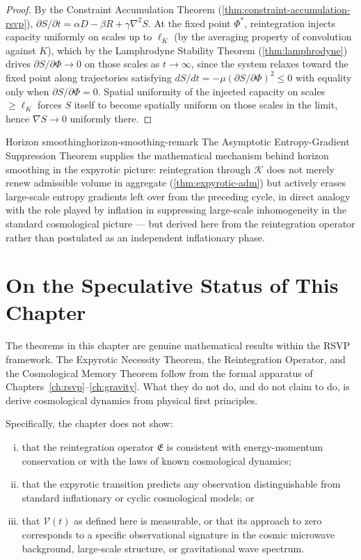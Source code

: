 \documentclass[12pt,twoside,openright]{book}
\begin{document}
\begin{proof}
  By the Constraint Accumulation Theorem
  (\cref{thm:constraint-accumulation-rsvp}),
  $\partial S/\partial t = \alpha D - \beta R + \gamma\nabla^2 S$.
  At the fixed point $\Phi^*$, reintegration injects capacity
  uniformly on scales up to $\ell_K$ (by the averaging
  property of convolution against $K$), which by the
  Lamphrodyne Stability Theorem (\cref{thm:lamphrodyne})
  drives $\partial S/\partial\Phi \to 0$ on those scales as
  $t\to\infty$, since the system relaxes toward the fixed
  point along trajectories satisfying
  $dS/dt = -\mu(\partial S/\partial\Phi)^2 \le 0$ with
  equality only when $\partial S/\partial\Phi = 0$. Spatial
  uniformity of the injected capacity on scales $\ge\ell_K$
  forces $S$ itself to become spatially uniform on those
  scales in the limit, hence $\nabla S \to 0$ uniformly
  there.
\end{proof}

\begin{remark}{Horizon smoothing}{horizon-smoothing-remark}
  The Asymptotic Entropy-Gradient Suppression Theorem
  supplies the mathematical mechanism behind horizon
  smoothing in the expyrotic picture: reintegration through
  $\mathcal{K}$ does not merely renew admissible volume in
  aggregate (\cref{thm:expyrotic-adm}) but actively erases
  large-scale entropy gradients left over from the
  preceding cycle, in direct analogy with the role played by
  inflation in suppressing large-scale inhomogeneity in the
  standard cosmological picture --- but derived here from
  the reintegration operator rather than postulated as an
  independent inflationary phase.
\end{remark}

\section{On the Speculative Status of This Chapter}
\label{sec:ch18-speculative-status}

The theorems in this chapter are genuine mathematical
results within the RSVP framework. The Expyrotic Necessity
Theorem, the Reintegration Operator, and the Cosmological
Memory Theorem follow from the formal apparatus of
Chapters~\ref{ch:rsvp}--\ref{ch:gravity}. What they do
not do, and do not claim to do, is derive cosmological
dynamics from physical first principles.

Specifically, the chapter does not show:
\begin{enumerate}[(i)]
  \item that the reintegration operator $\mathfrak{E}$ is
        consistent with energy-momentum conservation or
        with the laws of known cosmological dynamics;
  \item that the expyrotic transition predicts any
        observation distinguishable from standard
        inflationary or cyclic cosmological models; or
  \item that $\mathcal{V}(t)$ as defined here is
        measurable, or that its approach to zero
        corresponds to a specific observational signature
        in the cosmic microwave background, large-scale
        structure, or gravitational wave spectrum.
\end{enumerate}
\end{document}
